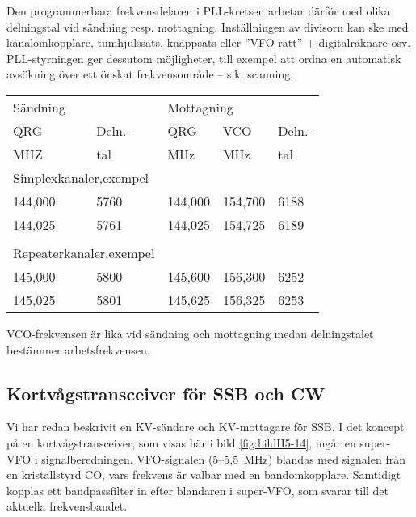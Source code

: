 Den programmerbara frekvensdelaren i PLL-kretsen arbetar därför med
olika delningstal vid sändning resp. mottagning.
Inställningen av divisorn kan ske med kanalomkopplare, tumhjulssats,
knappsats eller ''VFO-ratt'' + digitalräknare osv.
PLL-styrningen ger dessutom möjligheter, till exempel att ordna en automatisk
avsökning över ett önskat frekvensområde -- s.k. scanning.

\begin{table}[ht]
\begin{center}
  \begin{tabular}{ll|lll}
    \multicolumn{2}{l|}{Sändning} &
    \multicolumn{3}{l}{Mottagning} \\
    QRG & Deln.- & QRG & VCO & Deln.- \\
    MHZ & tal    & MHz & MHz & tal \\
    \hline
    \multicolumn{2}{l|}{Simplexkanaler,exempel} & & & \\
    144,000 & 5760 & 144,000 & 154,700 & 6188 \\
    144,025 & 5761 & 144,025 & 154,725 & 6189 \\
    & & & & \\
    \multicolumn{2}{l|}{Repeaterkanaler,exempel} & & & \\
    145,000 & 5800 & 145,600 & 156,300 & 6252 \\
    145,025 & 5801 & 145,625 & 156,325 & 6253 \\
  \end{tabular}
\end{center}
\end{table}

VCO-frekvensen är lika vid sändning och mottagning medan delningstalet
bestämmer arbetsfrekvensen.

\subsection{Kortvågstransceiver för SSB och CW}

Vi har redan beskrivit en KV-sändare och KV-mottagare för SSB.
I det koncept på en kortvågstransceiver, som visas här i
bild \ref{fig:bildII5-14}, ingår en super-VFO i signalberedningen.
VFO-signalen (5--5,5~MHz) blandas med signalen från en kristallstyrd CO,
vars frekvens är valbar med en bandomkopplare.
Samtidigt kopplas ett bandpassfilter in efter blandaren i super-VFO,
som svarar till det aktuella frekvensbandet.

